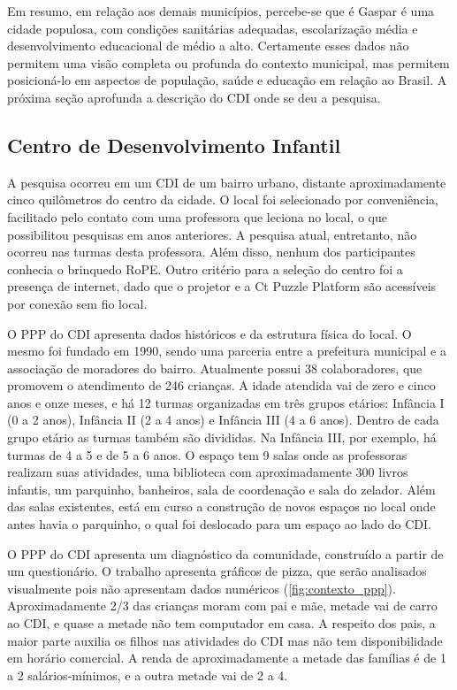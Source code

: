 Em resumo, em relação aos demais municípios, percebe-se que é Gaspar é uma cidade populosa, com condições sanitárias adequadas, escolarização média e desenvolvimento educacional de médio a alto. Certamente esses dados não permitem uma visão completa ou profunda do contexto municipal, mas permitem posicioná-lo em aspectos de população, saúde e educação em relação ao Brasil. A próxima seção aprofunda a descrição do CDI onde se deu a pesquisa.
 
\subsection{Centro de Desenvolvimento Infantil}
\label{sec:cdi}
A pesquisa ocorreu em um \ac{CDI} de um bairro urbano, distante aproximadamente cinco quilômetros do centro da cidade. O local foi selecionado por conveniência, facilitado pelo contato com uma professora que leciona no local, o que possibilitou pesquisas em anos anteriores. A pesquisa atual, entretanto, não ocorreu nas turmas desta professora. Além disso, nenhum dos participantes conhecia o brinquedo RoPE. Outro critério para a seleção do centro foi a presença de internet, dado que o projetor e a Ct Puzzle Platform são acessíveis por conexão sem fio local.
 
O \ac{PPP} do \ac{CDI} apresenta dados históricos e da estrutura física do local. O mesmo foi fundado em 1990, sendo uma parceria entre a prefeitura municipal e a associação de moradores do bairro. Atualmente possui 38 colaboradores, que promovem o atendimento de 246 crianças. A idade atendida vai de zero e cinco anos e onze meses, e há 12 turmas organizadas em três grupos etários: Infância I (0 a 2 anos), Infância II (2 a 4 anos) e Infância III (4 a 6 anos). Dentro de cada grupo etário as turmas também são divididas. Na Infância III, por exemplo, há turmas de 4 a 5 e de 5 a 6 anos. O espaço tem 9 salas onde as professoras realizam suas atividades, uma biblioteca com aproximadamente 300 livros infantis, um parquinho, banheiros, sala de coordenação e sala do zelador. Além das salas existentes, está em curso a construção de novos espaços no local onde antes havia o parquinho, o qual foi deslocado para um espaço ao lado do CDI.
 
O \ac{PPP} do \ac{CDI} apresenta um diagnóstico da comunidade, construído a partir de um questionário. O trabalho apresenta gráficos de pizza, que serão analisados visualmente pois não apresentam dados numéricos (\autoref{fig:contexto_ppp}). Aproximadamente 2/3 das crianças moram com pai e mãe, metade vai de carro ao \ac{CDI}, e quase a metade não tem computador em casa. A respeito dos pais, a maior parte auxilia os filhos nas atividades do \ac{CDI} mas não tem disponibilidade em horário comercial. A renda de aproximadamente a metade das famílias é de 1 a 2 salários-mínimos, e a outra metade vai de 2 a 4.
 
